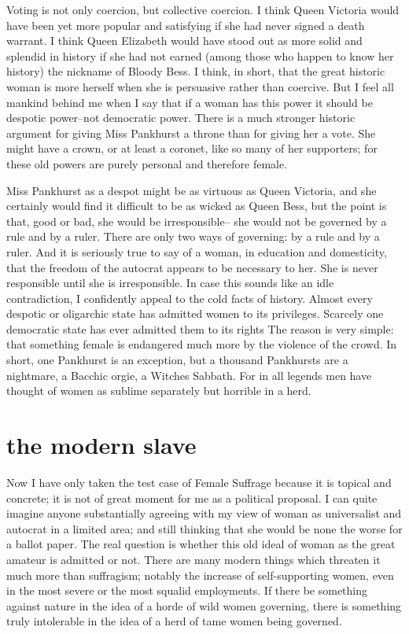 \documentclass[final,10pt,letterpaper,twocolumn,openany]{book}
\begin{document}
Voting is not only coercion, but collective coercion. I think Queen
Victoria would have been yet more popular and satisfying if she had never
signed a death warrant. I think Queen Elizabeth would have stood out as
more solid and splendid in history if she had not earned (among those who
happen to know her history) the nickname of Bloody Bess. I think, in short,
that the great historic woman is more herself when she is persuasive rather
than coercive. But I feel all mankind behind me when I say that if a
woman has this power it should be despotic power--not democratic power.
There is a much stronger historic argument for giving Miss Pankhurst a
throne than for giving her a vote. She might have a crown, or at least a
coronet, like so many of her supporters; for these old powers are purely
personal and therefore female. 

Miss Pankhurst as a despot might be as
virtuous as Queen Victoria, and she certainly would find it difficult to be
as wicked as Queen Bess, but the point is that, good or bad, she would be
irresponsible-- she would not be governed by a rule and by a ruler. There
are only two ways of governing: by a rule and by a ruler. And it is
seriously true to say of a woman, in education and domesticity, that the
freedom of the autocrat appears to be necessary to her. She is never
responsible until she is irresponsible. In case this sounds like an idle
contradiction, I confidently appeal to the cold facts of history. Almost
every despotic or oligarchic state has admitted women to its privileges.
Scarcely one democratic state has ever admitted them to its rights The
reason is very simple: that something female is endangered much more by
the violence of the crowd. In short, one Pankhurst is an exception, but a
thousand Pankhursts are a nightmare, a Bacchic orgie, a Witches Sabbath.
For in all legends men have thought of women as sublime separately but
horrible in a herd.

\section{the modern slave}

    Now I have only taken the test case of Female Suffrage because it is
topical and concrete; it is not of great moment for me as a political
proposal. I can quite imagine anyone substantially agreeing with my view
of woman as universalist and autocrat in a limited area; and still thinking
that she would be none the worse for a ballot paper. The real question is
whether this old ideal of woman as the great amateur is admitted or not.
There are many modern things which threaten it much more than
suffragism; notably the increase of self-supporting women, even in the
most severe or the most squalid employments. If there be something
against nature in the idea of a horde of wild women governing, there is
something truly intolerable in the idea of a herd of tame women being
governed. 
\end{document}
